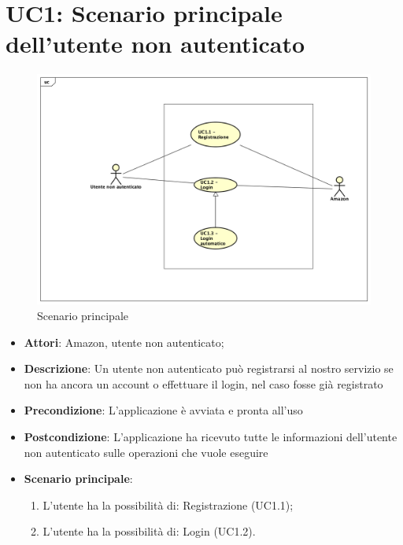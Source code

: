 \section{UC1: Scenario principale dell'utente non autenticato}
\label{UC1}
\begin{figure}[h]
	\centering
	\includegraphics[scale=0.4]{Diagram/UC1.png}
	\caption{Scenario principale}\label{}
\end{figure}

\begin{itemize}
	\item \textbf{Attori}: Amazon, utente non autenticato;
	\item \textbf{Descrizione}: Un utente non autenticato può registrarsi al nostro servizio se non ha ancora un account o effettuare il login, nel caso fosse già registrato
	\item \textbf{Precondizione}: L'applicazione è avviata e pronta all'uso
	\item \textbf{Postcondizione}: L'applicazione ha ricevuto tutte le informazioni dell'utente non autenticato sulle operazioni che vuole eseguire
	\item \textbf{Scenario principale}:
	\begin{enumerate} \item L'utente ha la possibilità di: Registrazione (UC1.1);  \item 
		L'utente ha la possibilità di: Login (UC1.2).\end{enumerate}
\end{itemize}

